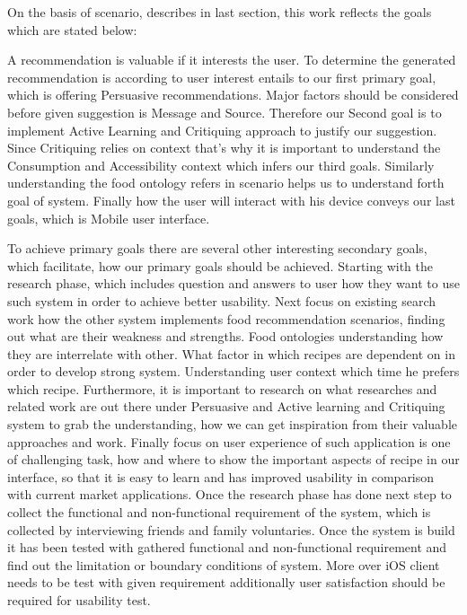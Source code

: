 On the basis of scenario, describes in last section, this work reflects the goals which are stated below:\newline

A recommendation is valuable if it interests the user. To determine the generated recommendation is according to user interest entails to our first primary goal, which is offering Persuasive recommendations. Major factors should be considered before given suggestion is Message and Source. Therefore our Second goal is to implement Active Learning and Critiquing approach to justify our suggestion. Since Critiquing relies on context that’s why it is important to understand the Consumption and Accessibility context which infers our third goals.  Similarly understanding the food ontology refers in scenario helps us to understand forth goal of system. Finally how the user will interact with his device conveys our last goals, which is Mobile user interface.\newline

To achieve primary goals there are several other interesting secondary goals, which facilitate, how our primary goals should be achieved. Starting with the research phase, which includes question and answers to user how they want to use such system in order to achieve better usability. Next focus on existing search work how the other system implements food recommendation scenarios, finding out what are their weakness and strengths. Food ontologies understanding how they are interrelate with other. What factor in which recipes are dependent on in order to develop strong system. Understanding user context which time he prefers which recipe. Furthermore, it is important to research on what researches and related work are out there under Persuasive and Active learning and Critiquing system to grab the understanding, how we can get inspiration from their valuable approaches and work. Finally focus on user experience of such application is one of challenging task, how and where to show the important aspects of recipe in our interface, so that it is easy to learn and has improved usability in comparison with current market applications.\newline
Once the research phase has done next step to collect the functional and non-functional requirement of the system, which is collected by interviewing friends and family voluntaries. Once the system is build it has been tested with gathered functional and non-functional requirement and find out the limitation or boundary conditions of system. More over iOS client needs to be test with given requirement additionally user satisfaction should be required for usability test.\newline

